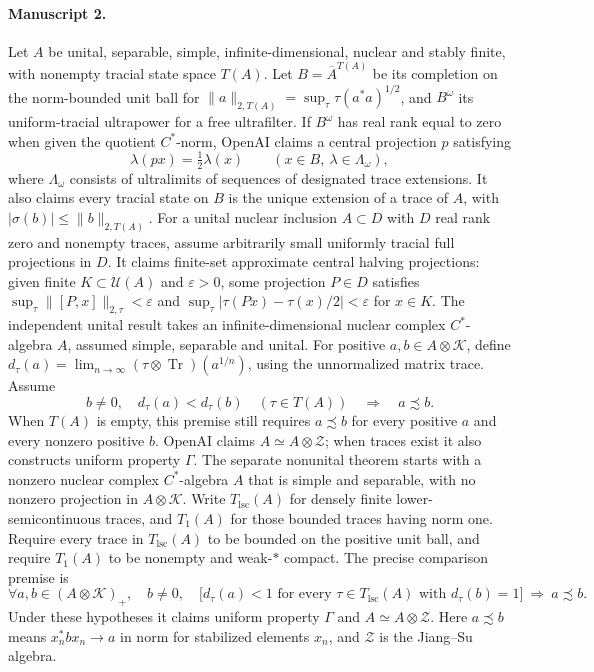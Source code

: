 \documentclass[11pt]{article}
\begin{document}
\paragraph{Manuscript 2.}
Let $A$ be unital, separable, simple, infinite-dimensional, nuclear and stably finite, with nonempty tracial state space $T(A)$. Let $B=\overline A^{T(A)}$ be its completion on the norm-bounded unit ball for $\|a\|_{2,T(A)}=\sup_\tau\tau(a^*a)^{1/2}$, and $B^\omega$ its uniform-tracial ultrapower for a free ultrafilter. If $B^\omega$ has real rank equal to zero when given the quotient $C^*$-norm, OpenAI claims a central projection $p$ satisfying
\[
\lambda(px)=\tfrac12\lambda(x)\qquad(x\in B,\ \lambda\in\Lambda_\omega),
\]
where $\Lambda_\omega$ consists of ultralimits of sequences of designated trace extensions. It also claims every tracial state on $B$ is the unique extension of a trace of $A$, with $|\sigma(b)|\le\|b\|_{2,T(A)}$.
For a unital nuclear inclusion $A\subset D$ with $D$ real rank zero and nonempty traces, assume arbitrarily small uniformly tracial full projections in $D$. It claims finite-set approximate central halving projections: given finite $K\subset\mathcal U(A)$ and $\varepsilon>0$, some projection $P\in D$ satisfies $\sup_\tau\|[P,x]\|_{2,\tau}<\varepsilon$ and $\sup_\tau|\tau(Px)-\tau(x)/2|<\varepsilon$ for $x\in K$.
The independent unital result takes an infinite-dimensional nuclear complex $C^*$-algebra $A$, assumed simple, separable and unital. For positive $a,b\in A\otimes\mathcal K$, define $d_\tau(a)=\lim_{n\to\infty}(\tau\otimes\operatorname{Tr})(a^{1/n})$, using the unnormalized matrix trace. Assume
\[
b\ne0,\quad d_\tau(a)<d_\tau(b)\quad(\tau\in T(A))\quad\Longrightarrow\quad a\precsim b.
\]
When $T(A)$ is empty, this premise still requires $a\precsim b$ for every positive $a$ and every nonzero positive $b$. OpenAI claims $A\simeq A\otimes\mathcal Z$; when traces exist it also constructs uniform property $\Gamma$.
The separate nonunital theorem starts with a nonzero nuclear complex $C^*$-algebra $A$ that is simple and separable, with no nonzero projection in $A\otimes\mathcal K$. Write $T_{\mathrm{lsc}}(A)$ for densely finite lower-semicontinuous traces, and $T_1(A)$ for those bounded traces having norm one. Require every trace in $T_{\mathrm{lsc}}(A)$ to be bounded on the positive unit ball, and require $T_1(A)$ to be nonempty and weak-$*$ compact. The precise comparison premise is
\[
\forall a,b\in(A\otimes\mathcal K)_+,\quad b\ne0,\quad
\bigl[d_\tau(a)<1\text{ for every }\tau\in T_{\mathrm{lsc}}(A)\text{ with }d_\tau(b)=1\bigr]
\ \Longrightarrow\ a\precsim b.
\]
Under these hypotheses it claims uniform property $\Gamma$ and $A\simeq A\otimes\mathcal Z$. Here $a\precsim b$ means $x_n^*bx_n\to a$ in norm for stabilized elements $x_n$, and $\mathcal Z$ is the Jiang--Su algebra.
\end{document}
